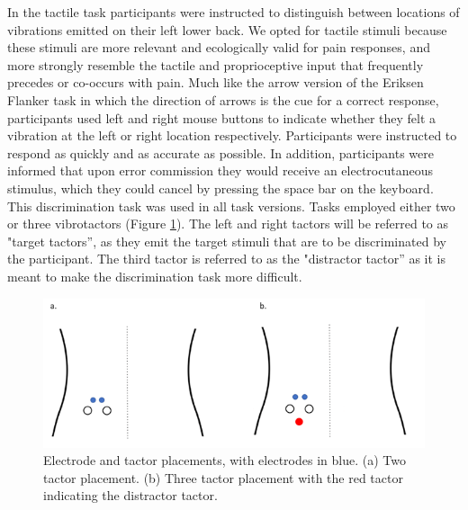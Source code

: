 \documentclass[twocolumn, serif, authordate, empirical]{jote-article}
\begin{document}
In the tactile task participants were instructed to distinguish between locations of vibrations emitted on their left lower back. We opted for tactile stimuli because these stimuli are more relevant and ecologically valid for pain responses, and more strongly resemble the tactile and proprioceptive input that frequently precedes or co-occurs with pain. Much like the arrow version of the Eriksen Flanker task in which the direction of arrows is the cue for a correct response, participants used left and right mouse buttons to indicate whether they felt a vibration at the left or right location respectively. Participants were instructed to respond as quickly and as accurate as possible. In addition, participants were informed that upon error commission they would receive an electrocutaneous stimulus, which they could cancel by pressing the space bar on the keyboard. This discrimination task was used in all task versions. Tasks employed either two or three vibrotactors (Figure \ref{fig:1}). The left and right tactors will be referred to as "target tactors'', as they emit the target stimuli that are to be discriminated by the participant. The third tactor is referred to as the "distractor tactor'' as it is meant to make the discrimination task more difficult.

\begin{figure}
    \centering
    \includegraphics[width=\columnwidth]{articles/empirical/traxler/Figure 1_Trial and Error (-Related Negativity) (5).png}
    \caption{Electrode and tactor placements, with electrodes in blue. (a) Two tactor placement. (b) Three tactor placement with the red tactor indicating the distractor tactor.}
    \label{fig:1}
\end{figure}
\end{document}
